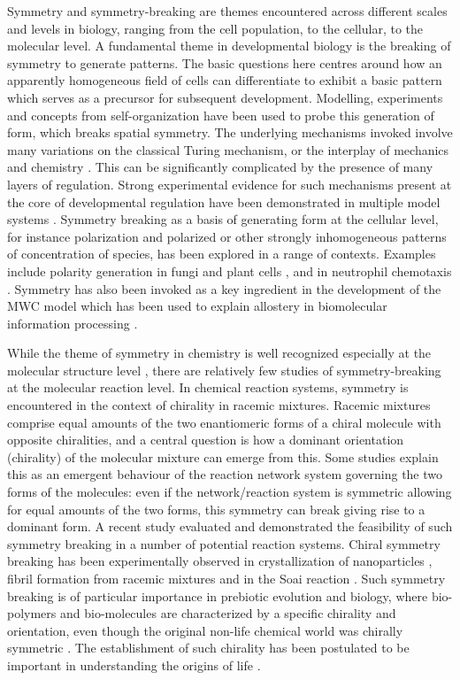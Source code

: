 \documentclass[9pt,lineno]{elife}
\begin{document}
Symmetry and symmetry-breaking are themes encountered across different scales and levels in biology, ranging from the cell population, to the cellular, to the molecular level. A fundamental theme in developmental biology is the breaking of symmetry to generate patterns. The basic questions here centres around how an apparently homogeneous field of cells can differentiate to exhibit a basic pattern which serves as a precursor for subsequent development. Modelling, experiments and concepts from self-organization have been used to probe this generation of form, which breaks spatial symmetry. The underlying mechanisms invoked involve many variations on the classical Turing mechanism, or the interplay of mechanics and chemistry \cite{Green2015, Maini2012}. This can be significantly complicated by the presence of many layers of regulation. Strong experimental evidence for such mechanisms present at the core of developmental regulation have been demonstrated in multiple model systems \cite{Onimaru2016}. Symmetry breaking as a basis of generating form at the cellular level, for instance polarization and polarized or other strongly inhomogeneous patterns of concentration of species, has been explored in a range of contexts. Examples include polarity generation in fungi and plant cells \cite{Khan2015}, and in neutrophil chemotaxis \cite{Wang2009}. Symmetry has also been invoked  as a key ingredient in the development of the MWC model which has been used to explain allostery in biomolecular information processing \cite{Changeux2012}.

While the theme of symmetry in chemistry is well recognized especially at the molecular structure level \cite{Hargittai1994}, there are relatively few studies of symmetry-breaking at the molecular reaction level. In chemical reaction systems, symmetry is encountered in the context of chirality in racemic mixtures. Racemic mixtures comprise equal amounts of the two enantiomeric forms of a chiral molecule with opposite chiralities, and a central question is how a dominant orientation (chirality) of the molecular mixture can emerge from this. Some studies explain this as an emergent behaviour of the reaction network system governing the two forms of the molecules: even if the network/reaction system is symmetric allowing for equal amounts of the two forms, this symmetry can break giving rise to a dominant form. A recent study \cite{Hochberg2017,Ribo2017a} evaluated and demonstrated the feasibility of such symmetry breaking in a number of potential reaction systems. Chiral symmetry breaking has been experimentally observed in crystallization of nanoparticles \cite{Hananel2019}, fibril formation from racemic mixtures \cite{Kushida2017} and in the Soai reaction \cite{Soai}. Such symmetry breaking is of particular importance in prebiotic evolution and biology, where bio-polymers and bio-molecules are characterized by a specific chirality and orientation, even though the original non-life chemical world was chirally symmetric \cite{Chen2020}. The establishment of such chirality has been postulated to be important in understanding the origins of life \cite{Blackmond2020}.   
\end{document}
